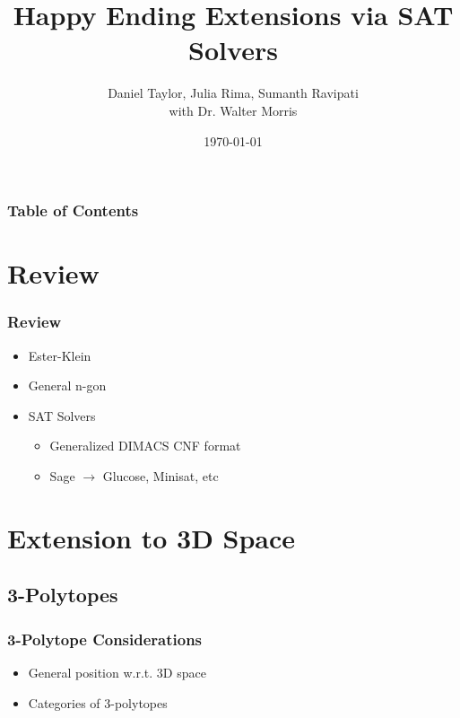 \documentclass{beamer}
\title{Happy Ending Extensions via SAT Solvers}
\author{Daniel Taylor, Julia Rima, Sumanth Ravipati
\\ with Dr. Walter Morris}
\institute{George Mason University, MEGL}
\date{\today}
\begin{document}
\begin{frame}
    \titlepage
\end{frame}

\begin{frame}
    \frametitle{Table of Contents}
        \tableofcontents
\end{frame}



\section{Review}

\begin{frame}
    \frametitle{Review}
    \begin{itemize}
        \item Ester-Klein
        \item General n-gon
        \item SAT Solvers
            \begin{itemize}
                \item Generalized DIMACS CNF format
                \item Sage $\rightarrow$ Glucose, Minisat, etc
            \end{itemize}
    \end{itemize}
\end{frame}

\section{Extension to 3D Space}

\subsection{3-Polytopes} 
\begin{frame}
    \frametitle{3-Polytope Considerations}
    \begin{itemize}
        \item General position w.r.t. 3D space
        \item Categories of 3-polytopes
    \end{itemize}
\end{frame}
\end{document}

